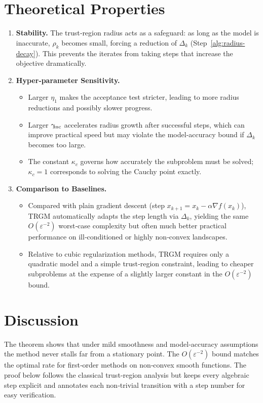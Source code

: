 \documentclass{article}
\begin{document}
\section*{Theoretical Properties}
\begin{enumerate}[label=\arabic*.]
\item \textbf{Stability.} The trust‑region radius acts as a safeguard: as long as the model is inaccurate, $\rho_{k}$ becomes small, forcing a reduction of $\Delta_{k}$ (Step~\ref{alg:radius-decay}). This prevents the iterates from taking steps that increase the objective dramatically.
\item \textbf{Hyper‑parameter Sensitivity.}
    \begin{itemize}
    \item Larger $\eta_{1}$ makes the acceptance test stricter, leading to more radius reductions and possibly slower progress.
    \item Larger $\gamma_{\!{\rm inc}}$ accelerates radius growth after successful steps, which can improve practical speed but may violate the model‑accuracy bound if $\Delta_{k}$ becomes too large.
    \item The constant $\kappa_{\!c}$ governs how accurately the subproblem must be solved; $\kappa_{\!c}=1$ corresponds to solving the Cauchy point exactly.
    \end{itemize}
\item \textbf{Comparison to Baselines.}
    \begin{itemize}
    \item Compared with plain gradient descent (step $x_{k+1}=x_{k}-\alpha\nabla f(x_{k})$), TRGM automatically adapts the step length via $\Delta_{k}$, yielding the same $O(\varepsilon^{-2})$ worst‑case complexity but often much better practical performance on ill‑conditioned or highly non‑convex landscapes.
    \item Relative to cubic regularization methods, TRGM requires only a quadratic model and a simple trust‑region constraint, leading to cheaper subproblems at the expense of a slightly larger constant in the $O(\varepsilon^{-2})$ bound.
    \end{itemize}
\end{enumerate}

\section*{Discussion}
The theorem shows that under mild smoothness and model‑accuracy assumptions the method never stalls far from a stationary point. The $O(\varepsilon^{-2})$ bound matches the optimal rate for first‑order methods on non‑convex smooth functions. The proof below follows the classical trust‑region analysis but keeps every algebraic step explicit and annotates each non‑trivial transition with a step number for easy verification.
\end{document}
